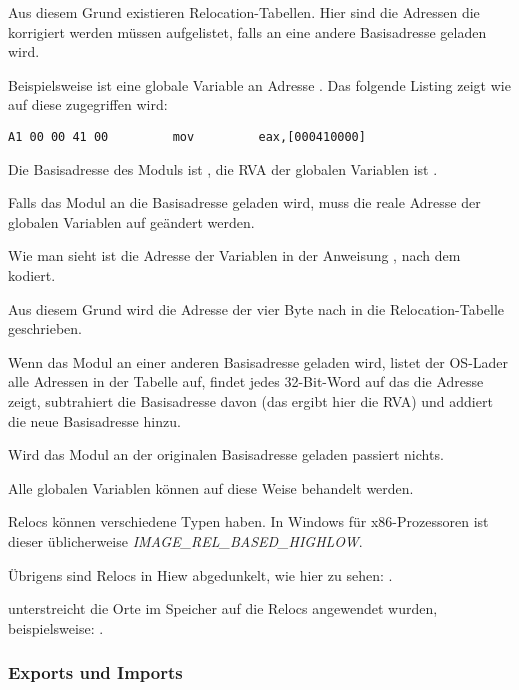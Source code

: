 Aus diesem Grund existieren Relocation-Tabellen. Hier sind die Adressen die korrigiert
werden müssen aufgelistet, falls an eine andere Basisadresse geladen wird.

Beispielsweise ist eine globale Variable an Adresse . Das folgende
Listing zeigt wie auf diese zugegriffen wird:

\begin{lstlisting}
A1 00 00 41 00         mov         eax,[000410000]
\end{lstlisting}

Die Basisadresse des Moduls ist , die \ac{RVA} der globalen Variablen
ist .

Falls das Modul an die Basisadresse  geladen wird, muss die reale
Adresse der globalen Variablen auf  geändert werden.


Wie man sieht ist die Adresse der Variablen in der Anweisung , nach dem
 kodiert.

Aus diesem Grund wird die Adresse der vier Byte nach  in die
Relocation-Tabelle geschrieben.

Wenn das Modul an einer anderen Basisadresse geladen wird, listet der \ac{OS}-Lader
alle Adressen in der Tabelle auf, findet jedes 32-Bit-Word auf das die Adresse zeigt,
subtrahiert die Basisadresse davon (das ergibt hier die \ac{RVA}) und addiert die
neue Basisadresse hinzu.

Wird das Modul an der originalen Basisadresse geladen passiert nichts.

Alle globalen Variablen können auf diese Weise behandelt werden.

Relocs können verschiedene Typen haben. In Windows für x86-Prozessoren ist dieser
üblicherweise \emph{IMAGE\_REL\_BASED\_HIGHLOW}.

Übrigens sind Relocs in Hiew abgedunkelt, wie hier zu sehen: .

\myindex{\olly}
\olly unterstreicht die Orte im Speicher auf die Relocs angewendet wurden,
beispielsweise: .

\subsubsection{Exports und Imports}

